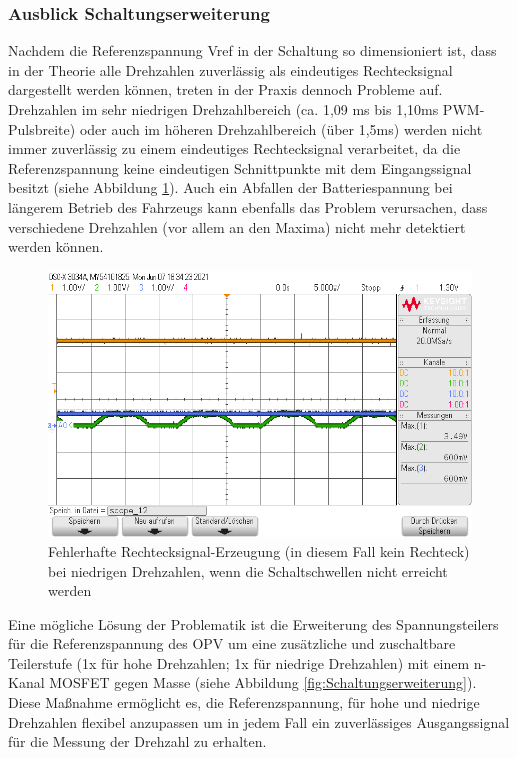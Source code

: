 \newpage
\subsubsection{Ausblick Schaltungserweiterung}\label{Sec4Sub5Sub4}
 
Nachdem die Referenzspannung Vref in der Schaltung so dimensioniert ist, dass in der Theorie alle Drehzahlen zuverlässig als eindeutiges Rechtecksignal dargestellt werden können, treten in der Praxis dennoch Probleme auf. Drehzahlen im sehr niedrigen Drehzahlbereich (ca. 1,09 ms bis 1,10ms PWM-Pulsbreite) oder auch im höheren Drehzahlbereich (über 1,5ms) werden nicht immer zuverlässig zu einem eindeutiges Rechtecksignal verarbeitet, da die Referenzspannung keine eindeutigen Schnittpunkte mit dem Eingangssignal besitzt (siehe Abbildung \ref{fig:ProblematikStopThrottle}). Auch ein Abfallen der Batteriespannung bei längerem Betrieb des Fahrzeugs kann ebenfalls das Problem verursachen, dass verschiedene Drehzahlen (vor allem an den Maxima) nicht mehr detektiert werden können.
 
\begin{figure}[H] %
\includegraphics[width=.95\textwidth]{sec4/images/Problematik_stop_throttle} 
\centering
\captionsetup{width=.95\textwidth}
\caption[Fehlerhafte Rechtecksignal-Erzeugung bei niedrigen Drehzahlen]{Fehlerhafte Rechtecksignal-Erzeugung (in diesem Fall kein Rechteck) bei niedrigen Drehzahlen, wenn die Schaltschwellen nicht erreicht werden}\centering
\label{fig:ProblematikStopThrottle}
\end{figure}

Eine mögliche Lösung der Problematik ist die Erweiterung des Spannungsteilers für die Referenzspannung des OPV um eine zusätzliche und zuschaltbare Teilerstufe (1x für hohe Drehzahlen; 1x für niedrige Drehzahlen) mit einem n-Kanal MOSFET gegen Masse (siehe Abbildung \ref{fig:Schaltungserweiterung}). Diese Maßnahme ermöglicht es, die Referenzspannung, für hohe und niedrige Drehzahlen flexibel anzupassen um in jedem Fall ein zuverlässiges Ausgangssignal für die Messung der Drehzahl zu erhalten.\vspace{11pt}

